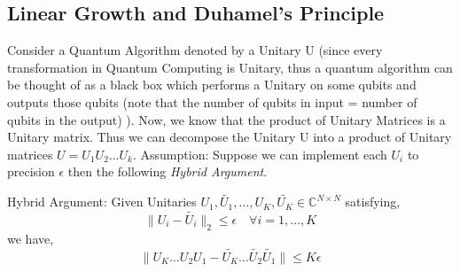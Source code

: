 \subsection{Linear Growth and Duhamel's Principle}
Consider a Quantum Algorithm denoted by a Unitary U (since every
transformation in Quantum Computing is Unitary, thus a quantum algorithm can be thought of as a black box
which performs a Unitary on some qubits and outputs those qubits (note that the number
of qubits in input = number of qubits in the output) ). Now,
we know that the product of Unitary Matrices is a Unitary matrix. Thus we
can decompose the Unitary U into a product of Unitary matrices $U=U_1U_2\ldots U_k$.
Assumption: Suppose we can implement each $U_i$ to precision $\epsilon$ then the following \textit{Hybrid Argument}.
\begin{proposition}\label{prop:duhamel}
    Hybrid Argument: Given Unitaries $U_1,\tilde{U_1},\ldots,U_K,\tilde{U_K} \in \mathbb{C}^{N \times N}$
    satisfying,
    \[\|U_i-\tilde{U_i}\|_2 \leq \epsilon \quad \forall i=1,\ldots,K\]
    we have,
    \[\|U_K\ldots U_2 U_1 - \tilde{U_K}\ldots \tilde{U_2}\tilde{U_1}\| \leq K\epsilon\]
\end{proposition}
